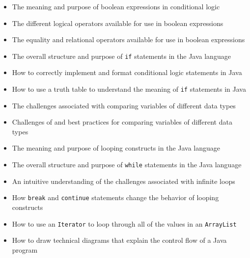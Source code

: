 \documentclass[11pt]{article}
\begin{document}
\begin{itemize}

  \itemsep 0in

  \item The meaning and purpose of boolean expressions in conditional logic

  \item The different logical operators available for use in boolean expressions

  \item The equality and relational operators available for use in boolean expressions

  \item The overall structure and purpose of {\tt if} statements in the Java
    language

  \item How to correctly implement and format conditional logic statements in
    Java

  \item How to use a truth table to understand the meaning of {\tt if}
    statements in Java

  \item The challenges associated with comparing variables of different data
    types

  \item Challenges of and best practices for comparing variables of different
    data types

  \item The meaning and purpose of looping constructs in the Java language

  \item The overall structure and purpose of {\tt while} statements in the Java
    language

  \item An intuitive understanding of the challenges associated with infinite
    loops

  \item How {\tt break} and {\tt continue} statements change the behavior of looping constructs

  \item How to use an {\tt Iterator} to loop through all of the values in an
    {\tt ArrayList}

  \item How to draw technical diagrams that explain the control flow of a Java
    program


\end{itemize}
\end{document}
